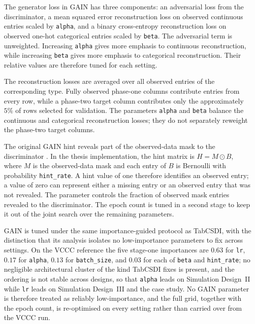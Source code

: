 The generator loss in GAIN has three components: an adversarial loss from the discriminator, a mean squared error reconstruction loss on observed continuous entries scaled by \texttt{alpha}, and a binary cross-entropy reconstruction loss on observed one-hot categorical entries scaled by \texttt{beta}. The adversarial term is unweighted. Increasing \texttt{alpha} gives more emphasis to continuous reconstruction, while increasing \texttt{beta} gives more emphasis to categorical reconstruction. Their relative values are therefore tuned for each setting.

The reconstruction losses are averaged over all observed entries of the corresponding type. Fully observed phase-one columns contribute entries from every row, while a phase-two target column contributes only the approximately $5\%$ of rows selected for validation. The parameters \texttt{alpha} and \texttt{beta} balance the continuous and categorical reconstruction losses; they do not separately reweight the phase-two target columns.

The original GAIN hint reveals part of the observed-data mask to the discriminator \citep{yoon2018gain}. In the thesis implementation, the hint matrix is $H=M\odot B$, where $M$ is the observed-data mask and each entry of $B$ is Bernoulli with probability \texttt{hint\_rate}. A hint value of one therefore identifies an observed entry; a value of zero can represent either a missing entry or an observed entry that was not revealed. The parameter controls the fraction of observed mask entries revealed to the discriminator. The epoch count is tuned in a second stage to keep it out of the joint search over the remaining parameters.

GAIN is tuned under the same importance-guided protocol as TabCSDI, with the distinction that its analysis isolates no low-importance parameters to fix across settings. On the VCCC reference the five stage-one importances are $0.63$ for \texttt{lr}, $0.17$ for \texttt{alpha}, $0.13$ for \texttt{batch\_size}, and $0.03$ for each of \texttt{beta} and \texttt{hint\_rate}; no negligible architectural cluster of the kind TabCSDI fixes is present, and the ordering is not stable across designs, so that \texttt{alpha} leads on Simulation Design~II while \texttt{lr} leads on Simulation Design~III and the case study. No GAIN parameter is therefore treated as reliably low-importance, and the full grid, together with the epoch count, is re-optimised on every setting rather than carried over from the VCCC run.

